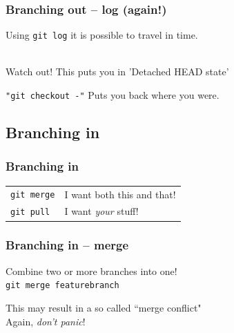 \documentclass{beamer}
\begin{document}
\begin{frame}
  \frametitle{Branching out -- log (again!)}

    Using \texttt{git log} it is possible to travel in time. \\[1em]

     \\[3em]

    \pause[3]

    \alert{Watch out! This puts you in 'Detached HEAD state'} \\[1em]

    \pause

    \texttt{"git checkout -"} Puts you back where you were.

\end{frame}

\subsection{Branching in}

\begin{frame}[fragile]
  \frametitle{Branching in}

  \begin{tabular}{ll}
    \texttt{git merge} & I want both this and that! \\
    \texttt{git pull} & I want \emph{your} stuff! \\
  \end{tabular}

\end{frame}

\begin{frame}
  \frametitle{Branching in -- merge} %

    Combine two or more branches into one! \\[1em]

    \texttt{git merge featurebranch} \\[3em]

    \pause

    This may result in a so called ``\alert{merge conflict}" \\[1em]

    Again, \emph{don't panic}!
\end{frame}
\end{document}
